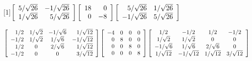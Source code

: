
\begin{enumerate}[!HW!, start=1]
\begin{multicols}{2}
\itemspade \scalebox{0.8}[1]{$\mtx{rr}{5/\sqrt{26} & -1/\sqrt{26} \\ 1/\sqrt{26} & 5/\sqrt{26}}\mtx{rr}{18&0\\0&-8}\mtx{rr}{5/\sqrt{26} & 1/\sqrt{26} \\ -1/\sqrt{26} & 5/\sqrt{26}}$} %
\itemspade {} %
\end{multicols}
\itemspade $\mtx{rccr}{1/2 & 1/\sqrt{2} & -1/\sqrt{6} & 1/\sqrt{12} \\ -1/2 & 1/\sqrt{2} & 1/\sqrt{6} & -1/\sqrt{12} \\ 1/2 & 0 & 2/\sqrt{6} & 1/\sqrt{12} \\ -1/2 & 0 & 0 & 3/\sqrt{12}}\mtx{rrrr}{-4&0&0&0\\0&8&0&0\\0&0&8&0\\0&0&0&8}\mtx{cccc}{1/2 & -1/2 & 1/2 & -1/2 \\ 1/\sqrt{2} & 1/\sqrt{2} & 0 & 0 \\ -1/\sqrt{6} & 1/\sqrt{6} & 2/\sqrt{6} & 0 \\ 1/\sqrt{12} & -1/\sqrt{12} & 1/\sqrt{12} & 3/\sqrt{12} }$ 

\end{enumerate}
